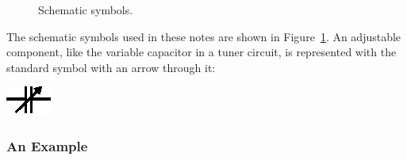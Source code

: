 \documentclass[11pt]{article}
\begin{document}
\begin{figure}[ht]
  \begin{center}
   \end{center}
  \caption{Schematic symbols.}
  \label{fig:schematics}
\end{figure}

The schematic symbols used in these notes are shown in
Figure~\ref{fig:schematics}. An adjustable component, like the
variable capacitor in a tuner circuit, is represented with the
standard symbol with an arrow through it: 
\begin{center}
  \includegraphics{var_capacitor.eps}
\end{center}

\subsubsection*{An Example}
\end{document}
